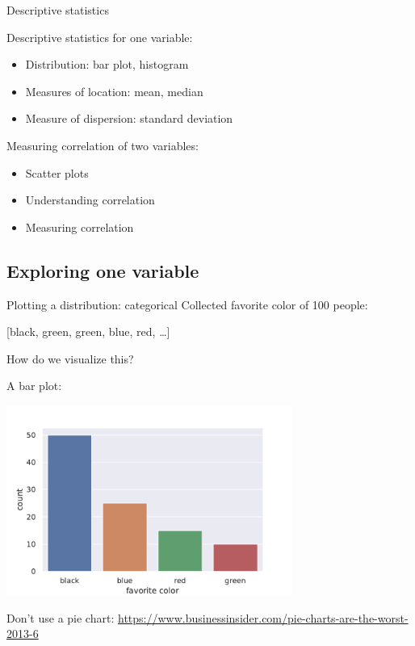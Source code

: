 \documentclass{beamer}
\begin{document}
\begin{frame}{Descriptive statistics}

Descriptive statistics for one variable:
\begin{itemize}
    \item Distribution: bar plot, histogram
    \item Measures of location: mean, median
    \item Measure of dispersion: standard deviation
\end{itemize}

Measuring correlation of two variables:
\begin{itemize}
    \item Scatter plots
    \item Understanding correlation
    \item Measuring correlation
\end{itemize}
\end{frame}

\subsection{Exploring one variable}

\begin{frame}{Plotting a distribution: categorical}
Collected favorite color of 100 people:

[black, green, green, blue, red, \dots ]

\vspace{1em}
How do we visualize this?

\pause
A bar plot:

\includegraphics[width=0.7\textwidth]{fig/barplot}

Don't use a pie chart: \url{https://www.businessinsider.com/pie-charts-are-the-worst-2013-6}
\end{frame}
\end{document}
